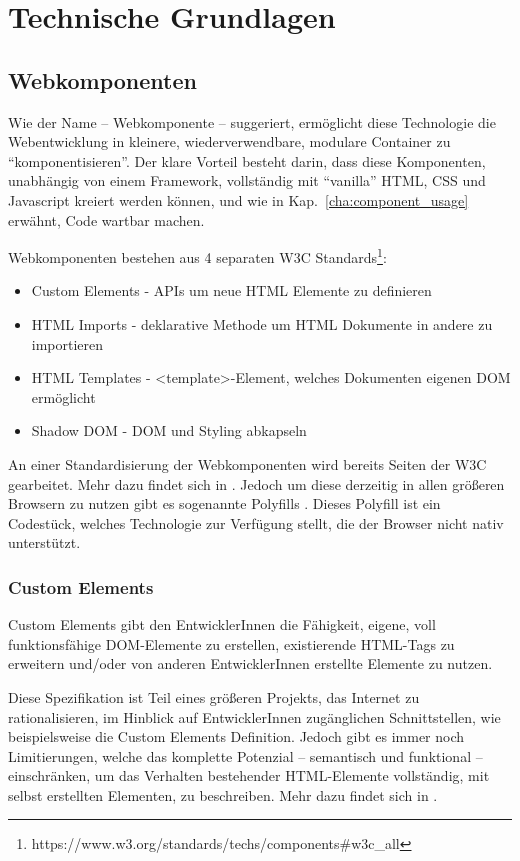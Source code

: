 \chapter{Technische Grundlagen}

\section{Webkomponenten}
Wie der Name -- Webkomponente -- suggeriert, ermöglicht diese Technologie die Webentwicklung in kleinere, wiederverwendbare, modulare Container zu "`komponentisieren"'.  Der klare Vorteil besteht darin, dass diese Komponenten, unabhängig von einem Framework, vollständig mit "`vanilla"' HTML, CSS und Javascript kreiert werden können, und wie in Kap.~\ref{cha:component_usage} erwähnt, Code wartbar machen.

Webkomponenten bestehen aus 4 separaten W3C Standards\footnote{https://www.w3.org/standards/techs/components\#w3c\_all}:
\begin{itemize}
	\item Custom Elements - APIs um neue HTML Elemente zu definieren
	\item HTML Imports - deklarative Methode um HTML Dokumente in andere zu importieren
	\item HTML Templates - <template>-Element, welches Dokumenten eigenen DOM ermöglicht
	\item Shadow DOM - DOM und Styling abkapseln
\end{itemize}
An einer Standardisierung der Webkomponenten wird bereits Seiten der W3C gearbeitet. Mehr dazu findet sich in \cite{w3c-components}. Jedoch um diese derzeitig in allen größeren Browsern zu nutzen gibt es sogenannte Polyfills \cite{polyfill}. Dieses Polyfill ist ein Codestück, welches Technologie zur Verfügung stellt, die der Browser nicht nativ unterstützt.

\subsection{Custom Elements}
Custom Elements gibt den EntwicklerInnen die Fähigkeit, eigene, voll funktionsfähige DOM-Elemente zu erstellen, existierende HTML-Tags zu erweitern und/oder von anderen EntwicklerInnen erstellte Elemente zu nutzen.  

Diese Spezifikation ist Teil eines größeren Projekts, das Internet zu rationalisieren, im Hinblick auf EntwicklerInnen zugänglichen Schnittstellen, wie beispielsweise die Custom Elements Definition. Jedoch gibt es immer noch Limitierungen, welche das komplette Potenzial -- semantisch und funktional -- einschränken, um das Verhalten bestehender HTML-Elemente vollständig, mit selbst erstellten Elementen, zu beschreiben. Mehr dazu findet sich in \cite{custom-elements}.

